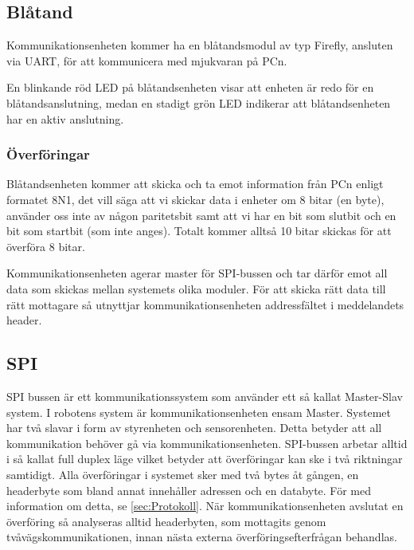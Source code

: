 \subsection{Blåtand}
Kommunikationsenheten kommer ha en blåtandsmodul av typ Firefly, ansluten via
UART, för att kommunicera med mjukvaran på PCn.

En blinkande röd LED på blåtandsenheten visar att enheten är redo för en
blåtandsanslutning, medan en stadigt grön LED indikerar att blåtandsenheten har
en aktiv anslutning.

\subsubsection{Överföringar}
Blåtandsenheten kommer att skicka och ta emot information från PCn enligt formatet
8N1, det vill säga att vi skickar data i enheter om 8 bitar (en byte), använder oss
inte av någon paritetsbit samt att vi har en bit som slutbit och en bit som startbit
(som inte anges). Totalt kommer alltså 10 bitar skickas för att överföra 8
bitar. 

Kommunikationsenheten agerar master för SPI-bussen och tar därför emot all data
som skickas mellan systemets olika moduler. För att skicka rätt data till rätt
mottagare så utnyttjar kommunikationsenheten addressfältet i meddelandets
header.

\subsection{SPI}
\label{sec:SPI}
SPI bussen är ett kommunikationssystem som använder ett så kallat Master-Slav system. I robotens system är kommunikationsenheten ensam Master. Systemet har två slavar i form av styrenheten och sensorenheten.
Detta betyder att all kommunikation behöver gå via kommunikationsenheten. SPI-bussen arbetar alltid i så kallat full duplex läge vilket betyder att överföringar kan ske i två riktningar samtidigt. Alla överföringar i systemet sker med två bytes åt gången, en headerbyte som bland annat innehåller adressen och en databyte. För med information om detta, se \ref{sec:Protokoll}. När kommunikationsenheten avslutat en överföring så analyseras alltid headerbyten, som mottagits genom tvåvägskommunikationen, innan nästa externa överföringsefterfrågan behandlas.

